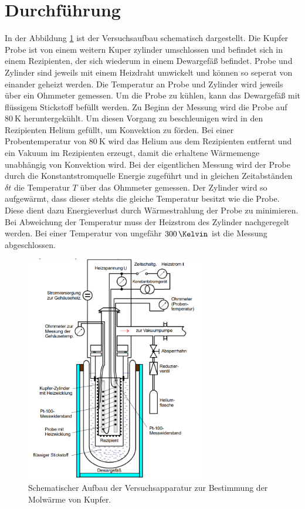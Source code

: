 \section{Durchführung}
\label{sec:Durchführung}
In der Abbildung \ref{fig:aufbau} ist der Versuchsaufbau schematisch
dargestellt. Die Kupfer Probe ist von einem weitern Kuper zylinder
umschlossen und
befindet sich
in einem Rezipienten, der sich wiederum in einem
Dewargefäß befindet. Probe und Zylinder
sind jeweils mit einem Heizdraht umwickelt und können so
seperat von einander geheizt werden.
Die Temperatur an Probe und Zylinder wird jeweils über ein Ohmmeter
gemessen.
Um die Probe
zu kühlen, kann das Dewargefäß mit flüssigem Stickstoff
befüllt werden.
Zu Beginn der Messung wird die Probe auf $\SI{80}{\kelvin}$
heruntergekühlt.
Um diesen Vorgang zu beschleunigen wird in den Rezipienten Helium
gefüllt, um Konvektion zu förden. Bei einer Probentemperatur von $\SI{80}{\kelvin}$ wird das Helium aus dem
Rezipienten entfernt und ein
Vakuum im Rezipienten
erzeugt, damit die erhaltene Wärmemenge unabhängig von Konvektion wird.
Bei der eigentlichen Messung wird der Probe durch die Konstantstromquelle
Energie zugeführt und
in gleichen Zeitabständen $\delta t$
die Temperatur $T$ über das Ohmmeter gemessen.
Der Zylinder wird so aufgewärmt, dass
dieser stehts die gleiche Temperatur
besitzt wie die Probe.
Diese dient dazu Energieverlust
durch Wärmestrahlung der Probe zu minimieren.
Bei Abweichung der Temperatur muss der Heizstrom des Zylinder
nachgeregelt werden. Bei einer Temperatur von ungefähr $\SI{300}{\Kelvin}$
ist die Messung abgeschlossen.



\begin{figure}
\centering
\includegraphics[width=0.7\textwidth]{Aufbau.PNG}
\caption{Schematischer Aufbau der Versuchsapparatur zur Bestimmung der Molwärme von Kupfer.}
\label{fig:aufbau}
\end{figure}

